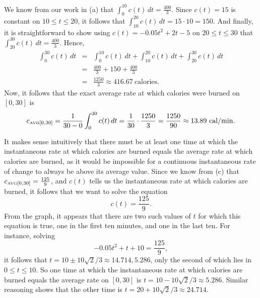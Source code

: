 \begin{activitySolution}
	We know from our work in (a) that $\int_0^{10} c(t) \, dt = \frac{400}{3}$.  Since $c(t) = 15$ is constant on $10 \le t \le 20$, it follows that $ \int_{10}^{20} c(t) \, dt  = 15 \cdot 10 = 150$.  And finally, it is straightforward to show using $c(t) = -0.05t^2 + 2t - 5$ on $20 \le t \le 30$ that $\int_{20}^{30} c(t) \, dt = \frac{400}{3}$.  Hence,
	\begin{eqnarray*}
	\int_0^{30} c(t) \, dt & = & \int_0^{10} c(t) \, dt +  \int_{10}^{20} c(t) \, dt +  \int_{20}^{30} c(t) \, dt \\
			& = & \frac{400}{3} + 150 + \frac{400}{3} \\
			& = & \frac{1250}{3} \approx 416.67 \ \mbox{calories}.
	\end{eqnarray*}
	Now, it follows that the exact average rate at which calories were burned on $[0,30]$ is
	$$c_{\mbox{\tiny{AVG}}[0,30]} = \frac{1}{30-0} \int_0^{30} c(t) \, dt = \frac{1}{30} \cdot \frac{1250}{3} = \frac{1250}{90} \approx 13.89 \ \mbox{cal/min}.$$
	\item It makes sense intuitively that there must be at least one time at which the instantaneous rate at which calories are burned equals the average rate at which calories are burned, as it would be impossible for a continuous instantaneous rate of change to always be above its average value.  Since we know from (c) that $c_{\mbox{\tiny{AVG}}[0,30]} = \frac{125}{9}$, and $c(t)$ tells us the instantaneous rate at which calories are burned, it follows that we want to solve the equation
	$$c(t) = \frac{125}{9}.$$
From the graph, it appears that there are two such values of $t$ for which this equation is true, one in the first ten minutes, and one in the last ten.  For instance, solving
$$-0.05t^2 + t + 10 = \frac{125}{9},$$
it follows that $t = 10 \pm 10\sqrt{2}/3 \approx 14.714, 5.286$, only the second of which lies in $0 \le t \le 10$.  So one time at which the instantaneous rate at which calories are burned equals the average rate on $[0,30]$ is $t = 10 - 10\sqrt{2}/3 \approx 5.286.$  Similar reasoning shows that the other time is $t = 20 + 10\sqrt{2}/3 \approx 24.714$.
\ea
\end{activitySolution}
\aftera





